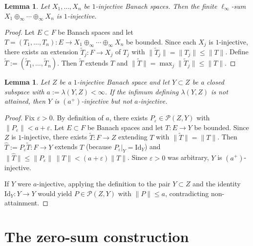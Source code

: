 \documentclass[11pt]{amsart}
\renewcommand{\le}{\leqslant}
\newtheorem{lemma}[theorem]{Lemma}
\theoremstyle{definition}
\theoremstyle{remark}
\theoremstyle{plain}
\numberwithin{equation}{section}
\newcommand{\id}{\mathrm{Id}}
\begin{document}
\begin{lemma}\label{lem:sum-injective}
Let $X_1,\dots,X_n$ be $1$-injective Banach spaces.  Then the finite
$\ell_\infty$-sum $X_1\oplus_\infty\cdots\oplus_\infty X_n$ is
$1$-injective.
\end{lemma}

\begin{proof}
Let $E\subset F$ be Banach spaces and let
$T=(T_1,\dots,T_n)\colon E\to X_1\oplus_\infty\cdots\oplus_\infty X_n$
be bounded.  Since each $X_j$ is $1$-injective, there exists an
extension $\widetilde T_j\colon F\to X_j$ of $T_j$ with
$\|\widetilde T_j\|=\|T_j\|\le\|T\|$.  Define
$\widetilde T:=(\widetilde T_1,\dots,\widetilde T_n)$.
Then $\widetilde T$ extends $T$ and
$\|\widetilde T\|=\max_j\|\widetilde T_j\|\le\|T\|$.
\end{proof}

\begin{lemma}\label{lem:from-proj-to-inj}
Let $Z$ be a $1$-injective Banach space and let $Y\subset Z$ be a closed
subspace with $a:=\lambda(Y,Z)<\infty$.  If the infimum defining $\lambda(Y,Z)$
is not attained, then $Y$ is $(a^+)$-injective but not $a$-injective.
\end{lemma}

\begin{proof}
Fix $\varepsilon>0$.  By definition of $a$, there exists
$P_\varepsilon\in\mathcal P(Z,Y)$ with
$\|P_\varepsilon\|<a+\varepsilon$.  Let $E\subset F$ be Banach spaces
and let $T\colon E\to Y$ be bounded.  Since $Z$ is $1$-injective, there
exists $\widetilde T\colon F\to Z$ extending $T$ with
$\|\widetilde T\|=\|T\|$.  Then
$\widehat T:=P_\varepsilon\widetilde T\colon F\to Y$ extends $T$
(because $P_\varepsilon|_Y=\id_Y$) and
$\|\widehat T\|\le\|P_\varepsilon\|\,\|T\|<(a+\varepsilon)\|T\|$.
Since $\varepsilon>0$ was arbitrary, $Y$ is $(a^+)$-injective.

If $Y$ were $a$-injective, applying the definition to the pair
$Y\subset Z$ and the identity $\id_Y\colon Y\to Y$ would yield
$P\in\mathcal P(Z,Y)$ with $\|P\|\le a$, contradicting non-attainment.
\end{proof}

\section{The zero-sum construction}\label{sec:zerosum}
\end{document}
